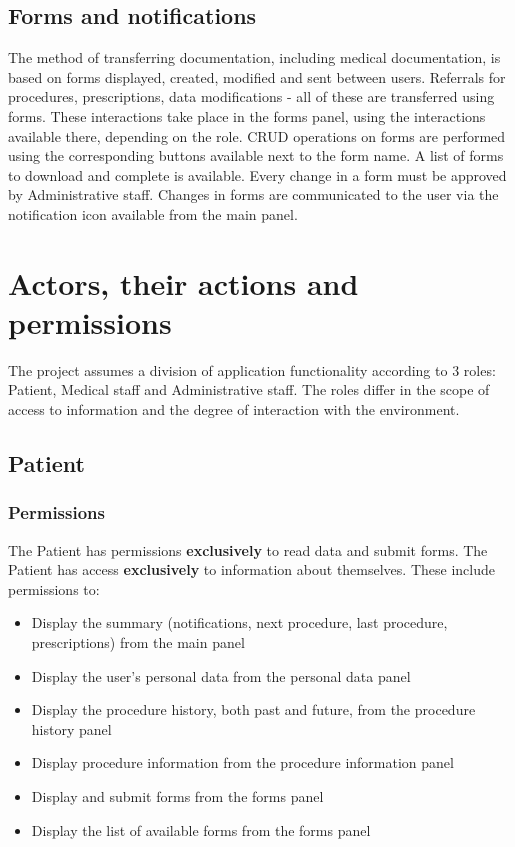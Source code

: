 \subsection{Forms and notifications}
The method of transferring documentation, including medical documentation, is based on forms displayed, created, modified and sent between users. Referrals for procedures, prescriptions, data modifications - all of these are transferred using forms. These interactions take place in the forms panel, using the interactions available there, depending on the role. CRUD operations on forms are performed using the corresponding buttons available next to the form name. A list of forms to download and complete is available. Every change in a form must be approved by Administrative staff. Changes in forms are communicated to the user via the notification icon available from the main panel.

\section{Actors, their actions and permissions}
The project assumes a division of application functionality according to 3 roles: Patient, Medical staff and Administrative staff. The roles differ in the scope of access to information and the degree of interaction with the environment.

\subsection{Patient}
\subsubsection{Permissions}
The Patient has permissions \textbf{exclusively} to read data and submit forms. The Patient has access \textbf{exclusively} to information about themselves. These include permissions to:\begin{itemize}
    \item Display the summary (notifications, next procedure, last procedure, prescriptions) from the main panel
    \item Display the user's personal data from the personal data panel
    \item Display the procedure history, both past and future, from the procedure history panel
    \item Display procedure information from the procedure information panel
    \item Display and submit forms from the forms panel
    \item Display the list of available forms from the forms panel
\end{itemize}
